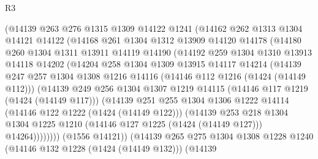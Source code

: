 \begin{lexlean}{R3}
\begin{coremodule}
            (@14139
              @263
              @276
              @1315
              @1309
              @14122
              @1241
              (@14162
                @262
                @1313
                @1304
                @14121
                @14122
                (@14168
                  @261
                  @1304
                  @1312
                  @13909
                  @14120
                  @14178
                  (@14180
                    @260
                    @1304
                    @1311
                    @13911
                    @14119
                    @14190
                    (@14192
                      @259
                      @1304
                      @1310
                      @13913
                      @14118
                      @14202
                      (@14204
                        @258
                        @1304
                        @1309
                        @13915
                        @14117
                        @14214
                        (@14139
                          @247
                          @257
                          @1304
                          @1308
                          @1216
                          @14116
                          (@14146 @112 @1216 (@1424 (@14149 @112)))
                          (@14139
                            @249
                            @256
                            @1304
                            @1307
                            @1219
                            @14115
                            (@14146 @117 @1219 (@1424 (@14149 @117)))
                            (@14139
                              @251
                              @255
                              @1304
                              @1306
                              @1222
                              @14114
                              (@14146 @122 @1222 (@1424 (@14149 @122)))
                              (@14139
                                @253
                                @218
                                @1304
                                @1304
                                @1225
                                @1210
                                (@14146 @127 @1225 (@1424 (@14149 @127)))
                                @14264))))))))
                (@1556 @14121))
              (@14139
                @265
                @275
                @1304
                @1308
                @1228
                @1240
                (@14146 @132 @1228 (@1424 (@14149 @132)))
                (@14139

\end{coremodule}
\end{lexlean}
